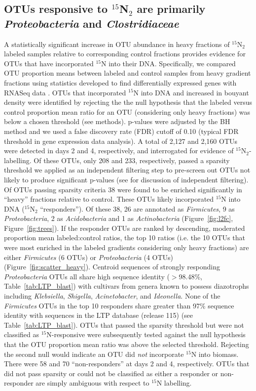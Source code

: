 \subsection{OTUs responsive to $^{15}$N$_{2}$ are primarily \textit{Proteobacteria}
and \textit{Clostridiaceae}}
A statistically significant increase in OTU abundance in heavy fractions of
$^{15}$N$_{2}$ labeled samples relative to corresponding control fractions
provides evidence for OTUs that have incorporated $^{15}$N into their DNA.
Specifically, we compared OTU proportion means between labeled and
control samples from heavy gradient fractions using statistics developed to
find differentially expressed genes with RNASeq data \citep{24699258,
Love_2014}. OTUs that incorporated $^{15}$N into DNA and increased in bouyant
density were identified by rejecting the the null hypothesis that the labeled
versus control proportion mean ratio for an OTU (considering only
heavy fractions) was below a chosen
threshold (see methods). p-values were adjusted by the BH method
\citep{citeulike:1042553} and we used a false discovery rate (FDR) cutoff of
0.10 (typical FDR threshold in gene expression data analysis). A total of 2,127
and 2,160 OTUs were detected in days 2 and 4, respectively, and interrogated
for evidence of $^{15}$N$_{2}$-labelling. Of these OTUs, only 208
and 233, respectively, passed a sparsity threshold we applied as an independent
filtering step to pre-screen out OTUs not likely to produce significant
p-values (see \citet{Love_2014} for discussion of independent filtering). Of OTUs
passing sparsity criteria 38 were found to be enriched significantly in
``heavy'' fractions relative to control. These OTUs likely incorporated
$^{15}$N into DNA ($^{15}$N$_{2}$ ``responders''). Of these 38, 26 are
annotated as \textit{Firmicutes}, 9 as \textit{Proteobacteria}, 2 as
\textit{Acidobacteria} and 1 as \textit{Actinobacteria} (Figure~\ref{fig:l2fc},
Figure~\ref{fig:trees}). If the responder OTUs are ranked by descending,
moderated proportion mean labeled:control ratios, the top 10 ratios (i.e. the
10 OTUs that were most enriched in the labeled gradients considering only heavy
fractions) are either \textit{Firmicutes} (6 OTUs) or \textit{Proteobacteria}
(4 OTUs) (Figure~\ref{fig:scatter_heavy}). Centroid sequences of
strongly responding \textit{Proteobacteria} OTUs all share high sequence identity
($>$98.48\%, Table~\ref{tab:LTP_blast}) with cultivars from genera
known to possess diazotrophs including \textit{Klebsiella}, \textit{Shigella},
\textit{Acinetobacter}, and \textit{Ideonella}. None of the \textit{Firmicutes}
OTUs in the top 10 responders share greater than 97\% sequence identity with
sequences in the LTP database (release 115) (see Table~\ref{tab:LTP_blast}).
OTUs that passed the sparsity threshold but were not classified as
$^{15}$N-responsive were subsequently tested against the null hypothesis that
the OTU proportion mean ratio was above the selected threshold. Rejecting the
second null would indicate an OTU did \textit{not} incorporate $^{15}$N into
biomass. There were 58 and 70 ``non-responders'' at days 2 and 4,
respectively. OTUs that did not pass sparsity or could not be classified as
either a responder or non-responder are simply ambiguous with respect to
$^{15}$N labelling.

